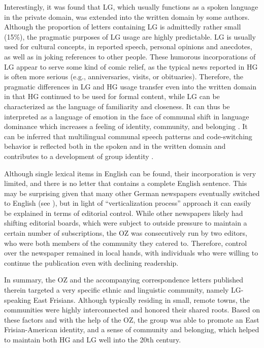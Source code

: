 \documentclass[output=paper]{langsci/langscibook}
\begin{document}
 
Interestingly, it was found that LG, which usually functions as a spoken language in the private domain, was extended into the written domain by some authors. Although the proportion of letters containing LG is admittedly rather small (15\%), the pragmatic purposes of LG usage are highly predictable. LG is usually used for cultural concepts, in reported speech, personal opinions and anecdotes, as well as in joking references to other people. These humorous incorporations of LG appear to serve some kind of comic relief, as the typical news reported in HG is often more serious (e.g., anniversaries, visits, or obituaries). Therefore, the pragmatic differences in LG and HG usage transfer even into the written domain in that HG continued to be used for formal content, while LG can be characterized as the language of familiarity and closeness. It can thus be interpreted as a language of emotion in the face of communal shift in language dominance which increases a feeling of identity, community, and belonging \citep{Pavlenko2002}. It can be inferred that multilingual communal speech patterns and code-switching behavior is reflected both in the spoken and in the written domain and contributes to a development of group identity .
 

 
Although single lexical items in English can be found, their incorporation is very limited, and there is no letter that contains a complete English sentence. This may be surprising given that many other German newspapers eventually switched to English (see ), but in light of  “verticalization process” approach it can easily be explained in terms of editorial control. While other newspapers likely had shifting editorial boards, which were subject to outside pressure to maintain a certain number of subscriptions, the OZ was consecutively run by two editors, who were both members of the community they catered to. Therefore, control over the newspaper remained in local hands, with individuals who were willing to continue the publication even with declining readership. 
 
 
In summary, the OZ and the accompanying correspondence letters published therein targeted a very specific ethnic and linguistic community, namely LG-speaking East Frisians. Although typically residing in small, remote towns, the communities were highly interconnected and honored their shared roots. Based on these factors and with the help of the OZ, the group was able to promote an East Frisian-American identity, and a sense of community and belonging, which helped to maintain both HG and LG well into the 20th century. 
\end{document}
